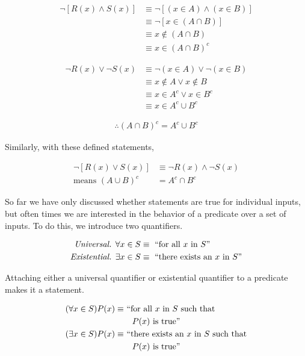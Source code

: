 \documentclass[twoside]{report}
\begin{document}
\begin{align*}
	\neg[R(x) \wedge S(x)] &\equiv \neg[(x \in A) \wedge (x \in B)] \\
	&\equiv \neg[x \in (A \cap B)] \\
	&\equiv x \notin (A \cap B) \\
	&\equiv x \in (A \cap B)^c
\end{align*}

\begin{align*}
	\neg R(x) \lor \neg S(x) &\equiv \neg(x \in A) \lor \neg(x \in B) \\
	&\equiv x \notin A \lor x \notin B \\
	&\equiv x \in A^c \lor x \in B^c \\
	&\equiv x \in A^c \cup B^c
\end{align*}

\begin{align*}
	\therefore (A \cap B)^c = A^c \cup B^c
\end{align*}

Similarly, with these defined statements,

\begin{align*}
	\neg[R(x) \lor S(x)] &\equiv \neg R(x) \wedge \neg S(x) \\
	\text{means } (A \cup B)^c &= A^c \cap B^c
\end{align*}

So far we have only discussed whether statements are true for individual inputs, but often times we are interested in the behavior of a predicate over a set of inputs. To do this, we introduce two quantifiers.

\begin{align*}
	\emph{Universal. } \forall x \in S &\equiv \text{ ``for all $x$ in $S$''} \\
	\emph{Existential. } \exists x \in S &\equiv \text{ ``there exists an $x$ in $S$''}
\end{align*}

Attaching either a universal quantifier or existential quantifier to a predicate makes it a statement.

\begin{align*}
	(\forall x \in S)P(x) \equiv &\text{ ``for all $x$ in $S$ such that} \\
	& \text{\quad $P(x)$ is true''} \\
	(\exists x \in S)P(x) \equiv &\text{ ``there exists an $x$ in $S$ such that} \\
	& \text{\quad $P(x)$ is true''}
\end{align*}
\end{document}
